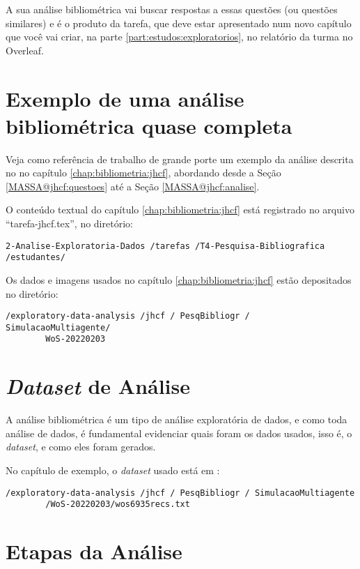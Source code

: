 A sua análise bibliométrica vai buscar respostas a essas questões (ou questões similares) e é o produto da tarefa, que deve estar apresentado num novo capítulo que você vai criar, na parte \ref{part:estudos:exploratorios}, no relatório da turma no Overleaf.

\section{Exemplo de uma análise bibliométrica quase completa}

Veja como referência de trabalho de grande porte um exemplo da análise descrita no 
no capítulo \ref{chap:bibliometria:jhcf}, abordando desde a  Seção \ref{MASSA@jhcf:questoes} até a Seção  \ref{MASSA@jhcf:analise}.

O conteúdo textual do capítulo \ref{chap:bibliometria:jhcf} está registrado no arquivo ``tarefa-jhcf.tex'', no diretório:
\begin{verbatim}
2-Analise-Exploratoria-Dados /tarefas /T4-Pesquisa-Bibliografica /estudantes/
\end{verbatim}

Os dados e imagens usados no capítulo \ref{chap:bibliometria:jhcf} estão depositados no diretório:
\begin{verbatim}
/exploratory-data-analysis /jhcf / PesqBibliogr / SimulacaoMultiagente/
        WoS-20220203
\end{verbatim}

\section{\textit{Dataset} de Análise}

A análise bibliométrica é um tipo de análise exploratória de dados, e como toda análise de dados, é fundamental evidenciar quais foram os dados usados,  isso é, o \textit{dataset}, e como eles foram gerados.

No capítulo de exemplo, o \textit{dataset} usado está em :

\begin{verbatim}
/exploratory-data-analysis /jhcf / PesqBibliogr / SimulacaoMultiagente
        /WoS-20220203/wos6935recs.txt
\end{verbatim}


\section{Etapas da Análise}

